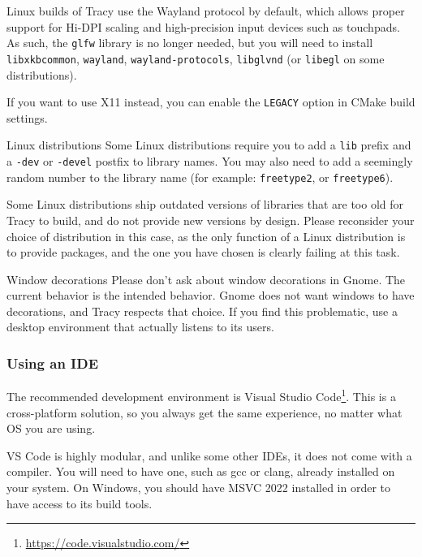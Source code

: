\documentclass[hidelinks,titlepage,a4paper,twoside]{article}
\begin{document}
Linux builds of Tracy use the Wayland protocol by default, which allows proper support for Hi-DPI scaling and high-precision input devices such as touchpads. As such, the \texttt{glfw} library is no longer needed, but you will need to install \texttt{libxkbcommon}, \texttt{wayland}, \texttt{wayland-protocols}, \texttt{libglvnd} (or \texttt{libegl} on some distributions).

If you want to use X11 instead, you can enable the \texttt{LEGACY} option in CMake build settings.

\begin{bclogo}[
noborder=true,
couleur=black!5,
logo=\bcbombe
]{Linux distributions}
Some Linux distributions require you to add a \texttt{lib} prefix and a \texttt{-dev} or \texttt{-devel} postfix to library names. You may also need to add a seemingly random number to the library name (for example: \texttt{freetype2}, or \texttt{freetype6}).

Some Linux distributions ship outdated versions of libraries that are too old for Tracy to build, and do not provide new versions by design. Please reconsider your choice of distribution in this case, as the only function of a Linux distribution is to provide packages, and the one you have chosen is clearly failing at this task.
\end{bclogo}

\begin{bclogo}[
noborder=true,
couleur=black!5,
logo=\bcbombe
]{Window decorations}
Please don't ask about window decorations in Gnome. The current behavior is the intended behavior. Gnome does not want windows to have decorations, and Tracy respects that choice. If you find this problematic, use a desktop environment that actually listens to its users.
\end{bclogo}

\subsubsection{Using an IDE}

The recommended development environment is Visual Studio Code\footnote{\url{https://code.visualstudio.com/}}. This is a cross-platform solution, so you always get the same experience, no matter what OS you are using.

VS Code is highly modular, and unlike some other IDEs, it does not come with a compiler. You will need to have one, such as gcc or clang, already installed on your system. On Windows, you should have MSVC 2022 installed in order to have access to its build tools.
\end{document}
